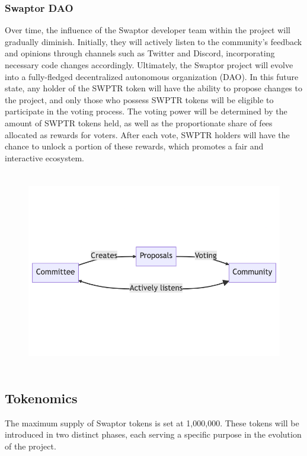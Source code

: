 \documentclass[12pt]{article}
\begin{document}
\subsubsection{Swaptor DAO}
Over time, the influence of the Swaptor developer team within the project will gradually diminish.
Initially, they will actively listen to the community's feedback and opinions through channels such as Twitter and Discord,
incorporating necessary code changes accordingly. Ultimately, the Swaptor project will evolve into a fully-fledged
decentralized autonomous organization (DAO). In this future state, any holder of the SWPTR token will have the
ability to propose changes to the project, and only those who possess SWPTR tokens will be eligible to participate
in the voting process. The voting power will be determined by the amount of SWPTR tokens held, as well as the proportionate
share of fees allocated as rewards for voters. After each vote, SWPTR holders will have the chance to unlock a portion of these rewards,
which promotes a fair and interactive ecosystem.


\begin{figure}[h]
  \centering
  \includegraphics[width=18cm,height=8.8cm,keepaspectratio=true]{governance.png}
  \label{fig:docvsnur}
\end{figure}


\newpage

\subsection{Tokenomics}
The maximum supply of Swaptor tokens is set at 1,000,000. These tokens will be introduced in two distinct phases,
each serving a specific purpose in the evolution of the project.
\end{document}
